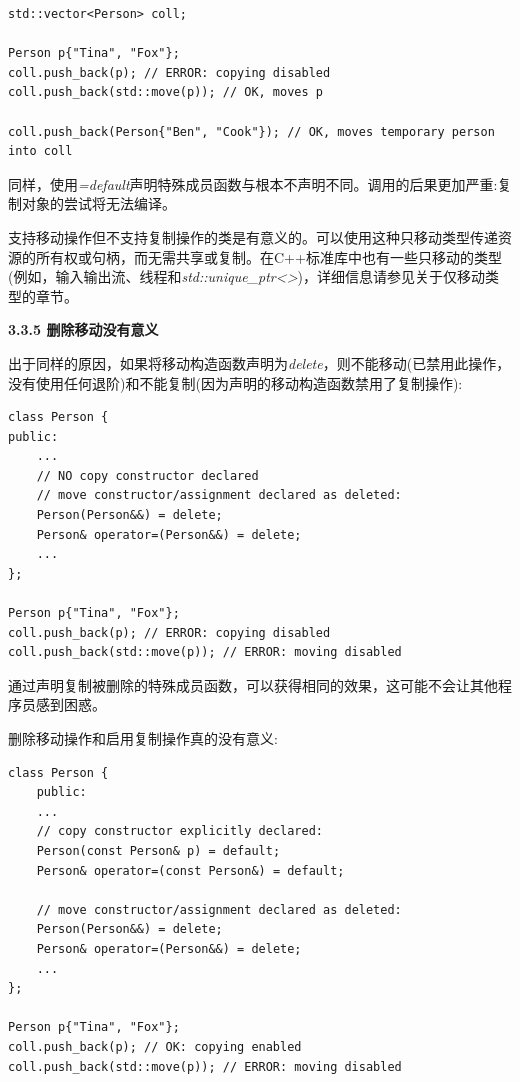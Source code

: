 \begin{lstlisting}[caption={}]
std::vector<Person> coll;

Person p{"Tina", "Fox"};
coll.push_back(p); // ERROR: copying disabled
coll.push_back(std::move(p)); // OK, moves p

coll.push_back(Person{"Ben", "Cook"}); // OK, moves temporary person into coll
\end{lstlisting}

同样，使用\textit{=default}声明特殊成员函数与根本不声明不同。调用的后果更加严重:复制对象的尝试将无法编译。\par

支持移动操作但不支持复制操作的类是有意义的。可以使用这种只移动类型传递资源的所有权或句柄，而无需共享或复制。在C++标准库中也有一些只移动的类型(例如，输入输出流、线程和\textit{std::unique\_ptr<>})，详细信息请参见关于仅移动类型的章节。\par

\hspace*{\fill} \par %
\textbf{3.3.5 删除移动没有意义}

出于同样的原因，如果将移动构造函数声明为\textit{delete}，则不能移动(已禁用此操作，没有使用任何退阶)和不能复制(因为声明的移动构造函数禁用了复制操作):\par

\begin{lstlisting}[caption={}]
class Person {
public:
	...
	// NO copy constructor declared
	// move constructor/assignment declared as deleted:
	Person(Person&&) = delete;
	Person& operator=(Person&&) = delete;
	...
};

Person p{"Tina", "Fox"};
coll.push_back(p); // ERROR: copying disabled
coll.push_back(std::move(p)); // ERROR: moving disabled
\end{lstlisting}

通过声明复制被删除的特殊成员函数，可以获得相同的效果，这可能不会让其他程序员感到困惑。\par

删除移动操作和启用复制操作真的没有意义:\par

\begin{lstlisting}[caption={}]
class Person {
	public:
	...
	// copy constructor explicitly declared:
	Person(const Person& p) = default;
	Person& operator=(const Person&) = default;
	
	// move constructor/assignment declared as deleted:
	Person(Person&&) = delete;
	Person& operator=(Person&&) = delete;
	...
};

Person p{"Tina", "Fox"};
coll.push_back(p); // OK: copying enabled
coll.push_back(std::move(p)); // ERROR: moving disabled
\end{lstlisting}

